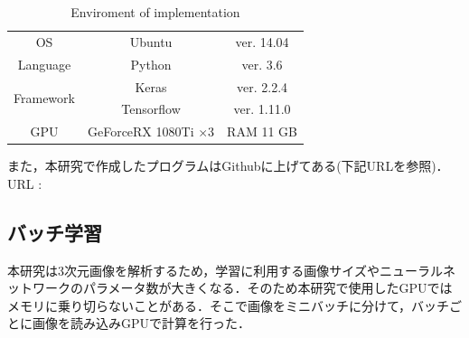 \begin{table}[H]
	\centering
	\caption{Enviroment of implementation}
	\label{tab:環境}
	\begin{tabular}{ccc}\toprule
		OS & Ubuntu & ver. 14.04 \\ 
		Language & Python & ver. 3.6 \\ 
		\multirow{2}{*}{Framework} & Keras & ver. 2.2.4 \\ 
		& Tensorflow & ver. 1.11.0 \\ 
		GPU & GeForceRX 1080Ti $\times$3 & RAM 11 GB \\  \bottomrule
	\end{tabular}
\end{table}

また，本研究で作成したプログラムはGithubに上げてある(下記URLを参照)．
URL : 


\subsection*{バッチ学習}
本研究は3次元画像を解析するため，学習に利用する画像サイズやニューラルネットワークのパラメータ数が大きくなる．そのため本研究で使用したGPUではメモリに乗り切らないことがある．そこで画像をミニバッチに分けて，バッチごとに画像を読み込みGPUで計算を行った．
